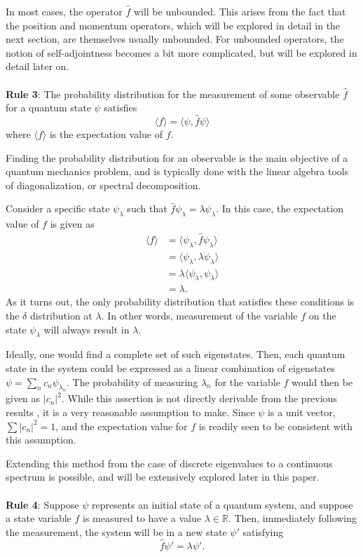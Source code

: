 In most cases, the operator $\hat{f}$ will be unbounded. This arises from the
fact that the position and momentum operators, which will be explored in detail
in the next section, are themselves usually unbounded. For unbounded operators,
the notion of self-adjointness becomes a bit more complicated, but will be
explored in detail later on.
\\
\\
\textbf{Rule 3}: The probability distribution for the measurement of some
observable $\hat{f}$ for a quantum state $\psi$ satisfies
\[
    \langle f \rangle = \langle \psi, \hat{f}\psi \rangle
\]
where $\langle f \rangle$ is the expectation value of $f$.


Finding the probability distribution for an observable is the main objective of
a quantum mechanics problem, and is typically done with the linear algebra tools
of diagonalization, or spectral decomposition.

Consider a specific state $\psi_{\lambda}$ such that
$\hat{f}\psi_{\lambda} = \lambda \psi_{\lambda}$.
In this case, the expectation value of $f$ is given as
\[
    \begin{aligned}
        \langle f \rangle &= \langle \psi_{\lambda},
        \hat{f}\psi_{\lambda} \rangle\\
        &= \langle \psi_{\lambda}, \lambda \psi_{\lambda} \rangle\\
        &= \lambda \langle \psi_{\lambda}, \psi_{\lambda} \rangle\\
        &= \lambda.
    \end{aligned}
\]
As it turns out, the only probability distribution that satisfies these
conditions is the $\delta$ distribution at $\lambda$. In other words,
measurement of the variable $f$ on the state $\psi_{\lambda}$ will always
result in $\lambda$.

Ideally, one would find a complete set of such eigenstates. Then, each quantum
state in the system could be expressed as a linear combination of eigenstates 
$\psi = \sum_{n} c_n\psi_{\lambda_n}$.
The probability of measuring $\lambda_n$ for the variable $f$ would then be given as
$|c_n|^2$. While this assertion is not directly derivable from the previous
results \cite[p. 67]{Hall2013}, it is a very reasonable assumption to make. Since
$\psi$ is a unit vector, $\sum |c_n|^2 = 1$, and the expectation value for $f$
is readily seen to be consistent with this assumption.

Extending this method from the case of discrete eigenvalues to a continuous
spectrum is possible, and will be extensively explored later in this paper.
\\
\\
\textbf{Rule 4}: Suppose $\psi$ represents an initial state of a quantum system,
and suppose a state variable $f$ is measured to have a value $\lambda \in
\mathbb{R}$. Then, immediately following the measurement, the system will be in
a new state $\psi '$ satisfying
\[
    \hat{f}\psi ' = \lambda \psi '.
\]

